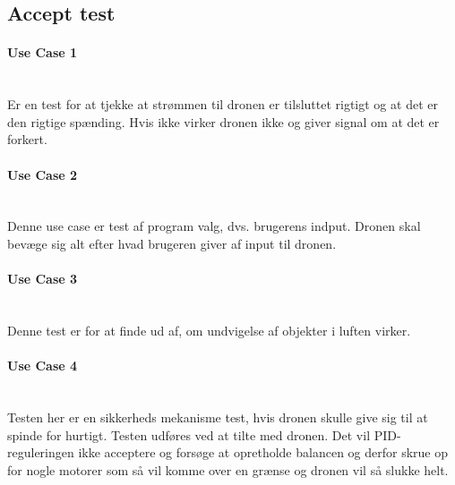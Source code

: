 \documentclass[Main]{subfiles}
\begin{document}
\subsection{Accept test}
\paragraph{Use Case 1}\mbox{}\\
Er en test for at tjekke at strømmen til dronen er tilsluttet rigtigt og at det er den rigtige spænding. Hvis ikke virker dronen ikke og giver signal om at det er forkert.

\paragraph{Use Case 2}\mbox{}\\
Denne use case er test af program valg, dvs. brugerens indput. Dronen skal bevæge sig alt efter hvad brugeren giver af input til dronen.

\paragraph{Use Case 3}\mbox{}\\
Denne test er for at finde ud af, om undvigelse af objekter i luften virker. 

\paragraph{Use Case 4}\mbox{}\\
Testen her er en sikkerheds mekanisme test, hvis dronen skulle give sig til at spinde for hurtigt. Testen udføres ved at tilte med dronen. Det vil PID-reguleringen ikke acceptere og forsøge at opretholde balancen og derfor skrue op for nogle motorer som så vil komme over en grænse og dronen vil så slukke helt.
\end{document}
